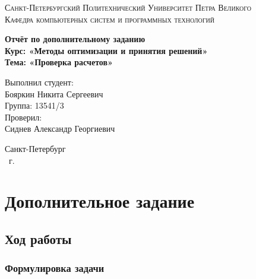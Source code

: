 \documentclass[14pt,a4paper,report]{report}
\begin{document}
\def\contentsname{Содержание}

\begin{titlepage}
	\begin{center}
		\textsc{Санкт-Петербургский Политехнический 
			Университет Петра Великого\\[5mm]
			Кафедра компьютерных систем и программных технологий}
		
		\vfill
		
		\textbf{Отчёт по дополнительному заданию\\[3mm]
			Курс: «Методы оптимизации и принятия решений»\\[3mm]
			Тема: «Проверка расчетов»\\[35mm]
			}
	\end{center}
	
	\hfill
	\begin{minipage}{.5\textwidth}
		Выполнил студент:\\[2mm] 
		Бояркин Никита Сергеевич\\
		Группа: 13541/3\\[5mm]
		
		Проверил:\\[2mm] 
		Сиднев Александр Георгиевич
	\end{minipage}
	\vfill
	\begin{center}
		Санкт-Петербург\\ \the\year\ г.
	\end{center}
\end{titlepage}

\tableofcontents
\clearpage

\chapter{Дополнительное задание}

\section{Ход работы}

\subsection{Формулировка задачи}
\end{document}

